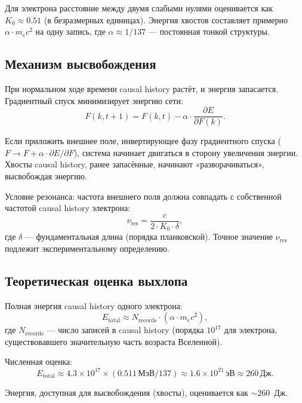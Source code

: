 \documentclass[12pt,a4paper]{article}
\begin{document}
Для электрона расстояние между двумя слабыми нулями оценивается как $K_0 \approx 0.51$ (в безразмерных единицах). Энергия хвостов составляет примерно $\alpha \cdot m_e c^2$ на одну запись, где $\alpha \approx 1/137$ --- постоянная тонкой структуры.

\subsection{Механизм высвобождения}
При нормальном ходе времени causal history растёт, и энергия запасается. Градиентный спуск минимизирует энергию сети:
\begin{equation}
    F(k, t+1) = F(k, t) - \alpha \cdot \frac{\partial E}{\partial F(k)}.
\end{equation}

Если приложить внешнее поле, инвертирующее фазу градиентного спуска ($F \to F + \alpha \cdot \partial E/\partial F$), система начинает двигаться в сторону увеличения энергии. Хвосты causal history, ранее запасённые, начинают «разворачиваться», высвобождая энергию.

Условие резонанса: частота внешнего поля должна совпадать с собственной частотой causal history электрона:
\begin{equation}
    \nu_{\text{res}} = \frac{c}{2 \cdot K_0 \cdot \delta},
\end{equation}
где $\delta$ --- фундаментальная длина (порядка планковской). Точное значение $\nu_{\text{res}}$ подлежит экспериментальному определению.

\subsection{Теоретическая оценка выхлопа}
Полная энергия causal history одного электрона:
\begin{equation}
    E_{\text{total}} \approx N_{\text{records}} \cdot (\alpha \cdot m_e c^2),
\end{equation}
где $N_{\text{records}}$ --- число записей в causal history (порядка $10^{17}$ для электрона, существовавшего значительную часть возраста Вселенной).

Численная оценка:
\begin{equation}
    E_{\text{total}} \approx 4.3 \times 10^{17} \times (0.511\,\text{МэВ} / 137) \approx 1.6 \times 10^{21}\,\text{эВ} \approx 260\,\text{Дж}.
\end{equation}

Энергия, доступная для высвобождения (хвосты), оценивается как $\sim 260$~Дж.
\end{document}
